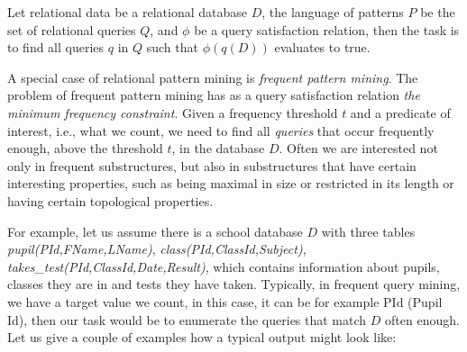 \begin{definition*}
\begin{mdframed}
    Let relational data be a relational database $D$, the language of
    patterns $P$ be the set of relational queries $Q$, and 
    $\phi$ be a query satisfaction relation, then the task is to find
    all queries $q$ in $Q$ such that $\phi(q(D))$ evaluates to true.
\end{mdframed}
\end{definition*}
A special case of relational pattern mining is 
\textit{frequent pattern mining}. The problem of frequent pattern
mining has as a query satisfaction relation \textit{the minimum frequency
constraint}. Given a frequency threshold $t$ and a predicate of
interest, i.e., what we count, we need to find
all \textit{queries} that occur frequently enough, above the
threshold $t$, in the database $D$. Often we are interested not only in
frequent substructures, but also in substructures that have certain
interesting properties, such as being maximal in size or restricted in
its length or having certain topological properties.

For example, let us assume there is a school database $D$ with three
tables \textit{pupil(PId,FName,LName)},
\textit{class(PId,ClassId,Subject)}, \\
\textit{takes\_test(PId,ClassId,Date,Result)}, which contains
information about pupils, classes they are in and tests they have
taken. Typically, in frequent query mining, we have a target value we
count, in this case, it can be for example PId (Pupil Id), then our
task would be to enumerate the queries that match $D$ often enough.
Let us give a couple of examples how a typical output might look like:

